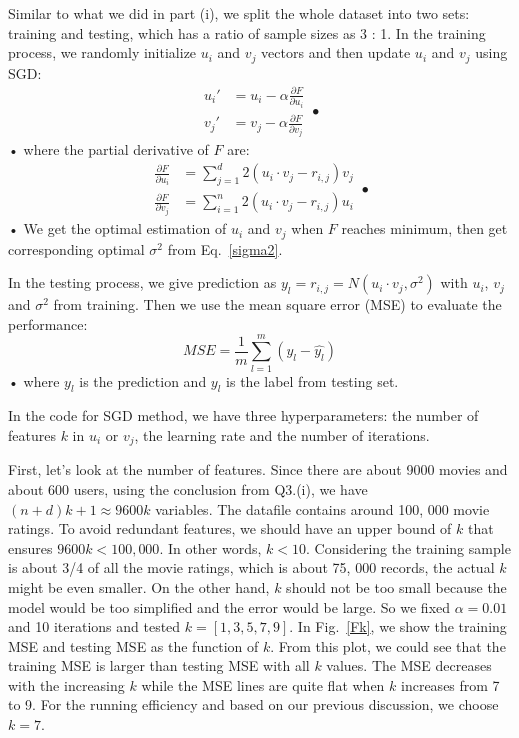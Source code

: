 \documentclass[twoside,11pt]{homework}
\begin{document}
Similar to what we did in part (i), we split the whole dataset into two sets: training and testing, which has a ratio of sample sizes as 3 : 1.
In the training process, we randomly initialize $u_i$ and $v_j$ vectors and then update $u_i$ and $v_j$ using SGD: 
%
\begin{equation}
\begin{split}
u_i' &= u_i - \alpha \frac{\partial F}{\partial u_i} \\
v_j' &= v_j - \alpha \frac{\partial F}{\partial v_j}
\end{split}•
\end{equation}•
%
where the partial derivative of $F$ are:
%
\begin{equation}
\begin{split}
\frac{\partial F}{\partial u_i} &= \sum\limits_{j=1}^d 2(u_i \cdot v_j- r_{i, j})  v_j \\
\frac{\partial F}{\partial v_j} &= \sum\limits_{i=1}^n 2(u_i \cdot v_j- r_{i, j})  u_i
\end{split}•
\end{equation}•
%
We get the optimal estimation of $u_i$ and $v_j$ when $F$ reaches minimum, then get corresponding optimal $\sigma^2$ from Eq.~\ref{sigma2}.

In the testing process, we give prediction as $y_l = r_{i, j} = N( u_i \cdot v_j, \sigma^2)$ with $u_i$, $v_j$ and $\sigma^2$ from training.
Then we use the mean square error (MSE) to evaluate the performance:
%
\begin{equation}
MSE = \frac{1}{m} \sum\limits_{l=1}^m (y_l - \hat{y_l})
\end{equation}•
%
where $y_l$ is the prediction and $y_l$ is the label from testing set.


In the code for SGD method, we have three hyperparameters: the number of features $k$ in $u_i$ or $v_j$, the learning rate and the number of iterations.

First, let's look at the number of features. 
Since  there are about 9000 movies and about 600 users, using the conclusion from Q3.(i), we have $(n+d)k+1 \approx 9600 k$ variables.
The datafile contains around 100, 000 movie ratings.
To avoid redundant features, we should have an upper bound of $k$ that ensures $9600 k < 100, 000$.
In other words, $k < 10$.
Considering the training sample is about 3/4 of all the movie ratings, which is about 75, 000 records, the actual $k$ might be even smaller.
On the other hand, $k$ should not be too small because the model would be too simplified and the error would be large.
So we fixed $\alpha = 0.01$ and 10 iterations and tested $k = [1,3,5,7,9]$.
In Fig.~\ref{Fk}, we show the training MSE and testing MSE as the function of $k$.
From this plot, we could see that the training MSE is larger than testing MSE with all $k$ values.
The MSE decreases with the increasing $k$ while the MSE lines are quite flat when $k$ increases from 7 to 9.
For the running efficiency and based on our previous discussion, we choose $k = 7$.
\end{document}
